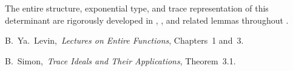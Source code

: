 \begin{theorem}
\begin{tcolorbox}[colback=gray!3!white,colframe=black!75!white,title={\textbf{Canonical Determinant Identity}}]
The entire structure, exponential type, and trace representation of this determinant are rigorously developed in , , and related lemmas throughout .
\end{tcolorbox}
\end{theorem}

\begin{references}
  \item B.~Ya.~Levin,\ \emph{Lectures on Entire Functions}, Chapters~1 and~3\cite{Levin1996EntireLectures}.
  \item B.~Simon,\ \emph{Trace Ideals and Their Applications}, Theorem~3.1\cite{Simon2005TraceIdeals}.
\end{references}
